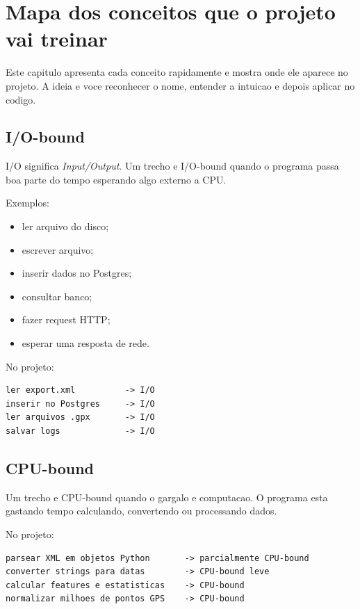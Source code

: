 \chapter{Mapa dos conceitos que o projeto vai treinar}

Este capitulo apresenta cada conceito rapidamente e mostra onde ele aparece no projeto. A ideia e voce reconhecer o nome, entender a intuicao e depois aplicar no codigo.

\section{I/O-bound}

I/O significa \textit{Input/Output}. Um trecho e I/O-bound quando o programa passa boa parte do tempo esperando algo externo a CPU.

Exemplos:

\begin{itemize}
  \item ler arquivo do disco;
  \item escrever arquivo;
  \item inserir dados no Postgres;
  \item consultar banco;
  \item fazer request HTTP;
  \item esperar uma resposta de rede.
\end{itemize}

No projeto:

\begin{verbatim}
ler export.xml          -> I/O
inserir no Postgres     -> I/O
ler arquivos .gpx       -> I/O
salvar logs             -> I/O
\end{verbatim}

\section{CPU-bound}

Um trecho e CPU-bound quando o gargalo e computacao. O programa esta gastando tempo calculando, convertendo ou processando dados.

No projeto:

\begin{verbatim}
parsear XML em objetos Python       -> parcialmente CPU-bound
converter strings para datas        -> CPU-bound leve
calcular features e estatisticas    -> CPU-bound
normalizar milhoes de pontos GPS    -> CPU-bound
\end{verbatim}

